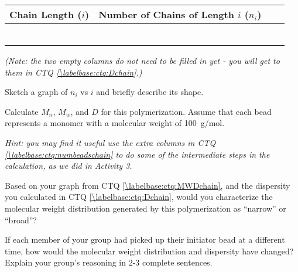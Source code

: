 \begin{activity}
\begin{ctqs}
		\begin{center}
		\renewcommand{\arraystretch}{2}
			\begin{tabular}{|c|c|c|c|}
				\hline
				\textbf{Chain Length ($i$)} & \textbf{Number of Chains of Length $i$ ($n_i$)} & \hspace{0.75in} & \hspace{0.75in} \\\hline
				&&&\\\hline
				&&&\\\hline
				&&&\\\hline
				&&&\\\hline
				&&&\\\hline
				&&&\\\hline
			\end{tabular}
		\end{center}
		
		\emph{(Note: the two empty columns do not need to be filled in yet - you will get to them in CTQ \ref{\labelbase:ctq:Dchain}.)}
		
	\question Sketch a graph of $n_i$ vs $i$ and briefly describe its shape. \label{\labelbase:ctq:MWDchain}
	
		\begin{solution}[2.75in]
		\end{solution}
	
	\question Calculate $M_n$, $M_w$, and $D$ for this polymerization.  Assume that each bead represents a monomer with a molecular weight of 100~g/mol. \label{\labelbase:ctq:Dchain}
	
		\emph{Hint: you may find it useful use the extra columns in CTQ \ref{\labelbase:ctq:numbeadschain} to do some of the intermediate steps in the calculation, as we did in Activity 3.}
	
		\begin{solution}[2.75in]
		\end{solution}
	
	\question Based on your graph from CTQ \ref{\labelbase:ctq:MWDchain}, and the dispersity you calculated in CTQ \ref{\labelbase:ctq:Dchain}, would you characterize the molecular weight distribution generated by this polymerization as ``narrow'' or ``broad''?  %
	
		\begin{solution}[1in]
		\end{solution}
	
	\question If each member of your group had picked up their initiator bead at a different time, how would the molecular weight distribution and dispersity have changed?  Explain your group's reasoning in 2-3 complete sentences.
	

\end{ctqs}
\end{activity}
